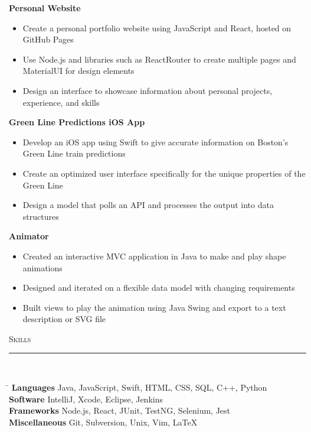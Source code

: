 \documentclass[11pt]{article}
\begin{document}
\begin{raggedright}
	\textbf{\large Personal Website} 
	\begin{itemize}
		\item Create a personal portfolio website using JavaScript and React, hosted on GitHub Pages
		\item Use Node.js and libraries such as ReactRouter to create multiple pages and MaterialUI for design elements
		\item Design an interface to showcase information about personal projects, experience, and skills
	\end{itemize}
	\vspace{0.1in}
	
	\textbf{\large Green Line Predictions iOS App} 
	\begin{itemize}
		\item Develop an iOS app using Swift to give accurate information on Boston's Green Line train predictions
		\item Create an optimized user interface specifically for the unique properties of the Green Line
		\item Design a model that polls an API and processes the output into data structures
	\end{itemize}
	\vspace{0.1in}
	
	\textbf{\large Animator} 
	\begin{itemize}
		\item Created an interactive MVC application in Java to make and play shape animations
		\item Designed and iterated on a flexible data model with changing requirements
		\item Built views to play the animation using Java Swing and export to a text description or SVG file 
	\end{itemize}
	\vspace{0.1in}
	
	
	\textsc{\Large Skills} \\
	\vspace{-0.1in}
	\rule{\textwidth}{0.4pt} \\
	\vspace{0.05in}

	\begin{tabbing}
		\hspace*{4cm}\= \kill
		\textbf{Languages}  \> Java, JavaScript, Swift, HTML, CSS, SQL, C++, Python \\
		\textbf{Software} \> IntelliJ, Xcode, Eclipse, Jenkins \\
		\textbf{Frameworks} \> Node.js, React, JUnit, TestNG, Selenium, Jest \\
		\textbf{Miscellaneous} \> Git, Subversion, Unix, Vim, LaTeX \\
	\end{tabbing}

	
\end{raggedright}	
\end{document}
